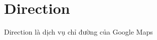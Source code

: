 \documentclass[../thesis.tex]{subfiles}
\begin{document}
\section{Direction}
Direction là dịch vụ chỉ đường của Google Maps
\end{document}
